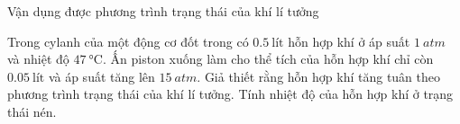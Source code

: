 \begin{dang}{Vận dụng được phương trình trạng thái của khí lí tưởng}
\end{dang}
\begin{vd}
	Trong cylanh của một động cơ đốt trong có $\SI{0.5}{\text{lít}}$ hỗn hợp khí ở áp suất $\SI{1}{atm}$ và nhiệt độ $\SI{47}{\celsius}$. Ấn piston xuống làm cho thể tích của hỗn hợp khí chỉ còn $\SI{0.05}{\text{lít}}$ và áp suất tăng lên $\SI{15}{atm}$. Giả thiết rằng hỗn hợp khí tăng tuân theo phương trình trạng thái của khí lí tưởng. Tính nhiệt độ của hỗn hợp khí ở trạng thái nén.
\end{vd}
